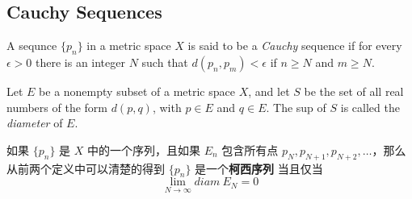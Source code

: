 \documentclass[../poma-notes.tex]{subfiles}
\begin{document}
\subsection*{Cauchy Sequences}

\begin{definition}
  A sequnce $\{p_n\}$ in a metric space $X$ is said to be a \textit{Cauchy} sequence if for every $\epsilon > 0$
  there is an integer $N$ such that $d(p_n, p_m) < \epsilon$ if $n \ge N$ and $m \ge N$.
\end{definition}

\begin{definition}
  Let $E$ be a nonempty subset of a metric space $X$, and let $S$ be the set of all real numbers of the form $d(p,q)$,
  with $p \in E$ and $q \in E$. The sup of $S$ is called the \textit{diameter} of $E$.
\end{definition}

如果 $\{p_n\}$ 是 $X$ 中的一个序列，且如果 $E_n$ 包含所有点 $p_N, p_{N+1}, p_{N+2}, \dots$，那么从前两个定义中可以清楚的得到
$\{p_n\}$ 是一个\textbf{柯西序列} 当且仅当
\[\lim_{N \to \infty} diam\ E_N = 0\]
\end{document}
